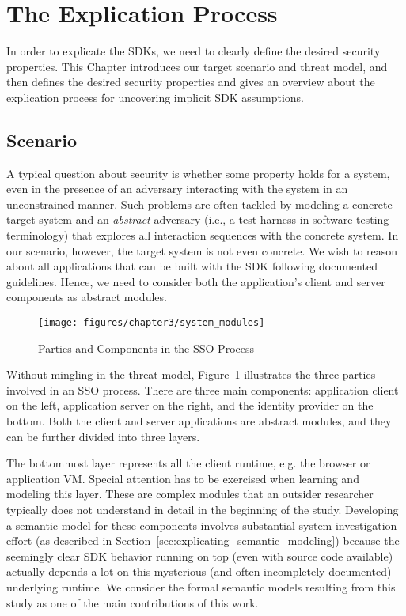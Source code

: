 \section{The Explication Process}
\label{sec:explicating_explication_process}

In order to explicate the SDKs, we need to clearly define the desired security properties. This Chapter introduces our target scenario and threat model, and then defines the desired security properties and gives an overview about the explication process for uncovering implicit SDK assumptions.

\subsection{Scenario}

A typical question about security is whether some property holds for a system, even in the presence of an adversary interacting with the system in an unconstrained manner.  Such problems are often tackled by modeling a concrete target system and an \emph{abstract} adversary (i.e., a test harness in software testing terminology) that explores all interaction sequences with the concrete system.  In our scenario, however, the target system is not even concrete.  We wish to reason about all applications that can be built with the SDK following documented guidelines.  Hence, we need to consider both the application's client and server components as abstract modules.

\begin{figure}[hbt]
\centering
\texttt{[image: figures/chapter3/system\_modules]}
\caption{Parties and Components in the SSO Process}
\label{fig:system_modules}
\end{figure}

Without mingling in the threat model, Figure~\ref{fig:system_modules} illustrates the three parties involved in an SSO process. There are three main components: application client on the left, application server on the right, and the identity provider on the bottom.  Both the client and server applications are abstract modules, and they can be further divided into three layers.  

The bottommost layer represents all the client runtime, e.g. the browser or application VM.  Special attention has to be exercised when learning and modeling this layer.  These are complex modules that an outsider researcher typically does not understand in detail in the beginning of the study.  Developing a semantic model for these components involves substantial system investigation effort (as described in Section~\ref{sec:explicating_semantic_modeling}) because the seemingly clear SDK behavior running on top (even with source code available) actually depends a lot on this mysterious (and often incompletely documented) underlying runtime.  We consider the formal semantic models resulting from this study as one of the main contributions of this work.

